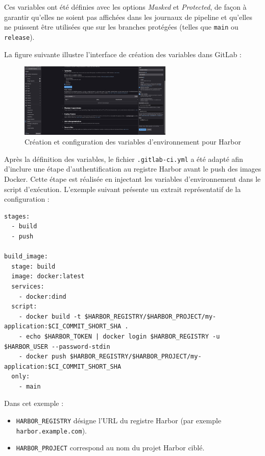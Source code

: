 Ces variables ont été définies avec les options \emph{Masked} et \emph{Protected}, de façon à garantir qu’elles ne soient pas affichées dans les journaux de pipeline et qu’elles ne puissent être utilisées que sur les branches protégées (telles que \texttt{main} ou \texttt{release}).

La figure suivante illustre l’interface de création des variables dans GitLab :

\begin{figure}[H]
	\centering
	\includegraphics[width=0.65\textwidth]{figures/gitlab variables creation.png}
	\caption{Création et configuration des variables d’environnement pour Harbor}
\end{figure}

Après la définition des variables, le fichier \texttt{.gitlab-ci.yml} a été adapté afin d’inclure une étape d’authentification au registre Harbor avant le push des images Docker. Cette étape est réalisée en injectant les variables d’environnement dans le script d’exécution. L’exemple suivant présente un extrait représentatif de la configuration :

\begin{lstlisting}[caption={Exemple de configuration GitLab CI pour push dans Harbor}]
stages:
  - build
  - push

build_image:
  stage: build
  image: docker:latest
  services:
    - docker:dind
  script:
    - docker build -t $HARBOR_REGISTRY/$HARBOR_PROJECT/my-application:$CI_COMMIT_SHORT_SHA .
    - echo $HARBOR_TOKEN | docker login $HARBOR_REGISTRY -u $HARBOR_USER --password-stdin
    - docker push $HARBOR_REGISTRY/$HARBOR_PROJECT/my-application:$CI_COMMIT_SHORT_SHA
  only:
    - main
\end{lstlisting}

Dans cet exemple :
\begin{itemize}
	\item \texttt{HARBOR\_REGISTRY} désigne l’URL du registre Harbor (par exemple \texttt{harbor.example.com}).
	\item \texttt{HARBOR\_PROJECT} correspond au nom du projet Harbor ciblé.
\end{itemize}

